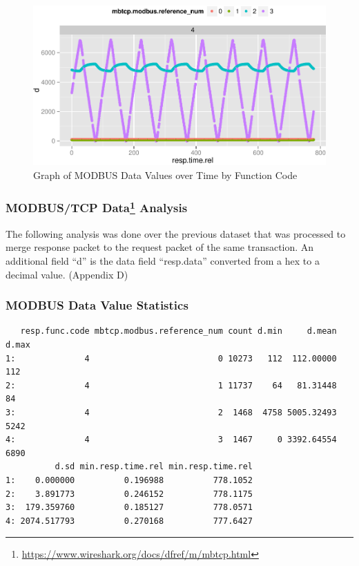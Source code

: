 \documentclass[11pt,a4paper]{article}
\let\rmarkdownfootnote\footnote%
\def\footnote{\protect\rmarkdownfootnote}
\begin{document}
\begin{figure}[h]

{\centering \includegraphics{thesis_files/figure-latex/unnamed-chunk-29-1} 

}

\caption{Graph of MODBUS Data Values over Time by Function Code}\label{fig:unnamed-chunk-29}
\end{figure}

\subsubsection[MODBUS/TCP Data Analysis]{MODBUS/TCP Data\footnote{\url{https://www.wireshark.org/docs/dfref/m/mbtcp.html}}
Analysis}\label{modbustcp-data3-analysis}

The following analysis was done over the previous dataset that was
processed to merge response packet to the request packet of the same
transaction. An additional field ``d'' is the data field ``resp.data''
converted from a hex to a decimal value. (Appendix D)

\subsubsection{MODBUS Data Value
Statistics}\label{modbus-data-value-statistics}

\begin{verbatim}
   resp.func.code mbtcp.modbus.reference_num count d.min     d.mean d.max
1:              4                          0 10273   112  112.00000   112
2:              4                          1 11737    64   81.31448    84
3:              4                          2  1468  4758 5005.32493  5242
4:              4                          3  1467     0 3392.64554  6890
          d.sd min.resp.time.rel min.resp.time.rel
1:    0.000000          0.196988          778.1052
2:    3.891773          0.246152          778.1175
3:  179.359760          0.185127          778.0571
4: 2074.517793          0.270168          777.6427
\end{verbatim}
\end{document}
